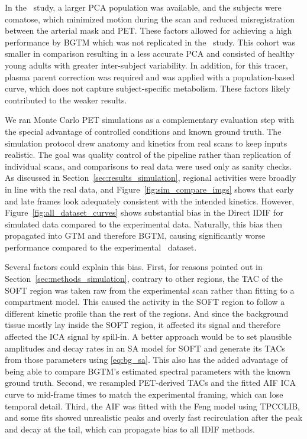 In the \fdg\ study, a larger PCA population was available, and the subjects were comatose, which minimized motion during the scan and reduced misregistration between the arterial mask and PET.
These factors allowed for achieving a high performance by BGTM which was not replicated in the \yohimbine\ study.
This cohort was smaller in comparison resulting in a less accurate PCA and consisted of healthy young adults with greater inter-subject variability.
In addition, for this tracer, plasma parent correction was required and was applied with a population-based curve, which does not capture subject-specific metabolism.
These factors likely contributed to the weaker results.

We ran Monte Carlo PET simulations as a complementary evaluation step with the special advantage of controlled conditions and known ground truth.
The simulation protocol drew anatomy and kinetics from real scans to keep inputs realistic.
The goal was quality control of the pipeline rather than replication of individual scans, and comparisons to real data were used only as sanity checks.
As discussed in Section~\ref{sec:results_simulation}, regional activities were broadly in line with the real data, and Figure~\ref{fig:sim_compare_imgs} shows that early and late frames look adequately consistent with the intended kinetics.
However, Figure~\ref{fig:all_dataset_curves} shows substantial bias in the Direct IDIF for simulated data compared to the experimental data.
Naturally, this bias then propagated into GTM and therefore BGTM, causing significantly worse performance compared to the experimental \fdg\ dataset.

Several factors could explain this bias.
First, for reasons pointed out in Section~\ref{sec:methods_simulation}, contrary to other regions, the TAC of the SOFT region was taken raw from the experimental scan rather than fitting to a compartment model.
This caused the activity in the SOFT region to follow a different kinetic profile than the rest of the regions.
And since the background tissue mostly lay inside the SOFT region, it affected its signal and therefore affected the ICA signal by spill-in.
A better approach would be to set plausible amplitudes and decay rates in an SA model for SOFT and generate its TACs from those parameters using \eqref{eq:bg_sa}.
This also has the added advantage of being able to compare BGTM’s estimated spectral parameters with the known ground truth.
Second, we resampled PET-derived TACs and the fitted AIF ICA curve to mid-frame times to match the experimental framing, which can lose temporal detail.
Third, the AIF was fitted with the Feng model using TPCCLIB, and some fits showed unrealistic peaks and overly fast recirculation after the peak and decay at the tail, which can propagate bias to all IDIF methods.

